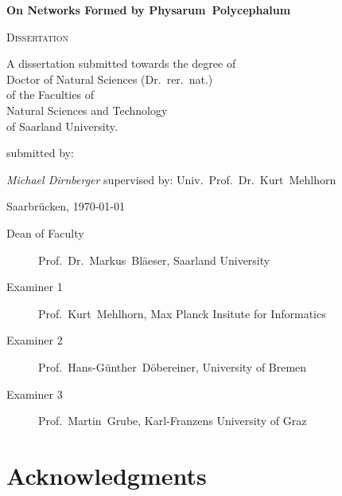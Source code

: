 
\begin{titlepage}
	\centering
	\vfill



	{\huge\bfseries On Networks Formed by Physarum~Polycephalum}
	\vfill

	{\scshape\Large Dissertation}
	\vfill



	{\large A dissertation submitted towards the degree of\\ 
	Doctor of Natural Sciences (Dr.~rer.~nat.)\\
	of the Faculties of\\
	Natural Sciences and Technology\\
	of Saarland University.}
	
	\vfill
	submitted by:
	\vfill

	{\Large\itshape Michael Dirnberger}
	\vfill
	supervised by:
	\vfill
	Univ.~Prof.~Dr.~Kurt~Mehlhorn

	\vfill

	{\large Saarbr\"ucken, \today}
\end{titlepage}


 \begin{description}
 	\item[Dean of Faculty] Prof.~Dr.~Markus~Bl\"aeser, Saarland University
	\item[Examiner 1] Prof.~Kurt~Mehlhorn, Max Planck Insitute for Informatics
	\item[Examiner 2] Prof.~Hans-G\"unther~D\"obereiner, University of Bremen
	\item[Examiner 3] Prof.~Martin~Grube, Karl-Franzens University of Graz
\end{description}

\section*{Acknowledgments}

	\blindtext
